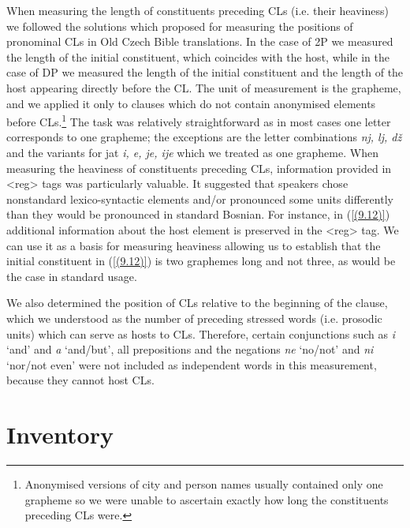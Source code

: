 When measuring the length of constituents preceding CLs (i.e. their heaviness) we followed the solutions which \citet{KCN18} proposed for measuring the positions of pronominal CLs in Old Czech Bible translations. In the case of 2P we measured the length of the initial constituent, which coincides with the host, while in the case of DP we measured the length of the initial constituent and the length of the host appearing directly before the CL. The unit of measurement is the grapheme, and we applied it only to clauses which do not contain anonymised elements before CLs.\footnote{Anonymised versions of city and person names usually contained only one grapheme so we were unable to ascertain exactly how long the constituents preceding CLs were. } The task was relatively straightforward as in most cases one letter corresponds to one grapheme; the exceptions are the letter combinations \textit{nj, lj, dž} and the variants for jat \textit{i, e, je, ije} which we treated as one grapheme. When measuring the heaviness of constituents preceding CLs, information provided in <reg> tags was particularly valuable. It suggested that speakers chose nonstandard lexico-syntactic elements and/or pronounced some units differently than they would be pronounced in standard Bosnian. For instance, in (\ref{(9.12)}) additional information about the host element is preserved in the <reg> tag. We can use it as a basis for measuring heaviness allowing us to establish that the initial constituent in (\ref{(9.12)}) is two graphemes long and not three, as would be the case in standard usage.


\noindent We also determined the position of CLs relative to the beginning of the clause, which we understood as the number of preceding stressed words (i.e. prosodic units) which can serve as hosts to CLs. Therefore, certain conjunctions such as \textit{i} ‘and’ and \textit{a} ‘and/but’, all prepositions and the negations \textit{ne} ‘no/not’ and \textit{ni} ‘nor/not even’ were not included as independent words in this measurement, because they cannot host CLs. 

\section{Inventory}
\label{Inventory:9}
